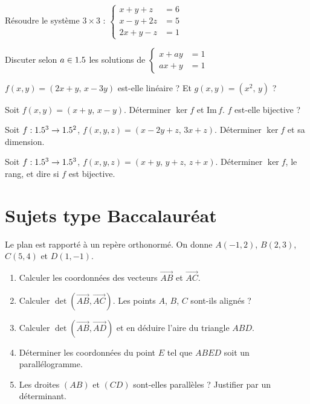 \exo{} Résoudre le système $3\times3$ :
$\left\{\begin{aligned}x+y+z&=6\\ x-y+2z&=5\\ 2x+y-z&=1\end{aligned}\right.$

\exo{} Discuter selon $a\in1.5$ les solutions de
$\left\{\begin{aligned}x+ay&=1\\ ax+y&=1\end{aligned}\right.$

\exo{} $f(x,y)=(2x+y,\,x-3y)$ est-elle linéaire ? Et $g(x,y)=(x^2,\,y)$ ?

\exo{} Soit $f(x,y)=(x+y,\,x-y)$. Déterminer $\ker f$ et $\mathrm{Im}\,f$. $f$ est-elle
bijective ?

\exo{} Soit $f:1.5^3\to1.5^2$, $f(x,y,z)=(x-2y+z,\,3x+z)$. Déterminer $\ker f$ et sa dimension.

\exo{} Soit $f:1.5^3\to1.5^3$, $f(x,y,z)=(x+y,\,y+z,\,z+x)$. Déterminer $\ker f$, le rang, et
dire si $f$ est bijective.

\section{Sujets type Baccalauréat}

Le plan est rapporté à un repère orthonormé. On donne $A(-1,2)$, $B(2,3)$, $C(5,4)$ et $D(1,-1)$.
\begin{enumerate}[label=\arabic*)]
\item Calculer les coordonnées des vecteurs $\vec{AB}$ et $\vec{AC}$.
\item Calculer $\det(\vec{AB},\vec{AC})$. Les points $A$, $B$, $C$ sont-ils alignés ?
\item Calculer $\det(\vec{AB},\vec{AD})$ et en déduire l'aire du triangle $ABD$.
\item Déterminer les coordonnées du point $E$ tel que $ABED$ soit un parallélogramme.
\item Les droites $(AB)$ et $(CD)$ sont-elles parallèles ? Justifier par un déterminant.
\end{enumerate}

